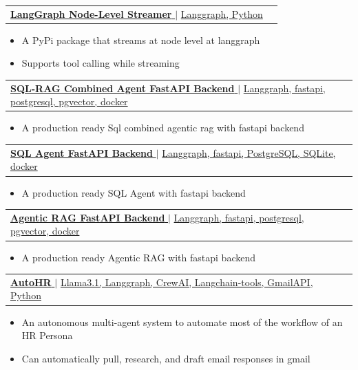 \documentclass[letterpaper,11pt]{article}
\makeatletter
\newcommand{\resumeItem}[1]{
  \item\small{
    {#1 \vspace{-2pt}}
  }
}
\newcommand{\resumeProjectHeading}[2]{
    \item
    \begin{tabular*}{1.001\textwidth}{l@{\extracolsep{\fill}}r}
      \small#1 & \textbf{\small #2}\\
    \end{tabular*}\vspace{-7pt}
}
\newcommand{\resumeItemListStart}{\begin{itemize}}
\newcommand{\resumeItemListEnd}{\end{itemize}\vspace{-5pt}}
\makeatother
\begin{document}
        \resumeProjectHeading
          {\href{https://pypi.org/project/langgraph-node-streamer/}{\textbf{\large{{LangGraph Node-Level Streamer}}} \href{https://pypi.org/project/langgraph-node-streamer/}{\raisebox{-0.1\height}\faExternalLink }} $|$ \large{\underline{Langgraph, Python}}}{}
          \vspace{-13pt}
          \resumeItemListStart
            \resumeItem{\normalsize{A PyPi package that streams at node level at langgraph}}
            \resumeItem{\normalsize{Supports tool calling while streaming}}
          \resumeItemListEnd
        \vspace{-18pt}
        \resumeProjectHeading
          {\href{https://github.com/remon-rakibul/sql-rag-fastapi-backend}{\textbf{\large{{SQL-RAG Combined Agent FastAPI Backend}}} \href{https://github.com/remon-rakibul/sql-rag-fastapi-backend}{\raisebox{-0.1\height}\faExternalLink }} $|$ \large{\underline{Langgraph, fastapi, postgresql, pgvector, docker}}}{}
          \vspace{-13pt}
          \resumeItemListStart
            \resumeItem{\normalsize{A production ready Sql combined agentic rag with fastapi backend}}
          \resumeItemListEnd
\vspace{-18pt}
        \resumeProjectHeading
          {\href{https://github.com/remon-rakibul/agentic-rag-fastapi-backend}{\textbf{\large{{SQL Agent FastAPI Backend}}} \href{https://github.com/remon-rakibul/agentic-rag-fastapi-backend}{\raisebox{-0.1\height}\faExternalLink }} $|$ \large{\underline{Langgraph, fastapi, PostgreSQL, SQLite, docker}}}{}
          \vspace{-13pt}
          \resumeItemListStart
            \resumeItem{\normalsize{A production ready SQL Agent with fastapi backend}}
          \resumeItemListEnd
\vspace{-18pt}
        \resumeProjectHeading
          {\href{https://github.com/remon-rakibul/agentic-rag-fastapi-backend}{\textbf{\large{{Agentic RAG FastAPI Backend}}} \href{https://github.com/remon-rakibul/agentic-rag-fastapi-backend}{\raisebox{-0.1\height}\faExternalLink }} $|$ \large{\underline{Langgraph, fastapi, postgresql, pgvector, docker}}}{}
          \vspace{-13pt}
          \resumeItemListStart
            \resumeItem{\normalsize{A production ready Agentic RAG with fastapi backend}}
          \resumeItemListEnd
\vspace{-18pt}
        \resumeProjectHeading
          {\href{https://github.com/remon-rakibul/autonomous-hr}{\textbf{\large{{AutoHR}}} \href{https://github.com/remon-rakibul/autonomous-hr}{\raisebox{-0.1\height}\faExternalLink }} $|$ \large{\underline{Llama3.1, Langgraph, CrewAI, Langchain-tools, GmailAPI, Python}}}{}
          \vspace{-13pt}
          \resumeItemListStart
            \resumeItem{\normalsize{An autonomous multi-agent system to automate most of the workflow of an HR Persona}}
            \resumeItem{\normalsize{Can automatically pull, research, and draft email responses in gmail}}
          \resumeItemListEnd 
\end{document}
